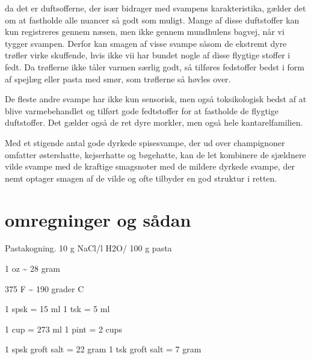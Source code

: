 \documentclass[
]{book}
\begin{document}
da det er duftsofferne, der især bidrager med svampens karakteristika, gælder
det om at fastholde alle nuancer så godt som muligt. Mange af disse duftstoffer
kan kun registreres gennem næsen, men ikke gennem mundhulens bagvej, når vi
tygger svampen. Derfor kan smagen af visse svampe såsom de ekstremt dyre trøfler
virke skuffende, hvis ikke vii har bundet nogle af disse flygtige stoffer i fedt.
Da trøflerne ikke tåler varmen særlig godt, så tilføres fedstoffer bedst i form
af spejlæg eller pasta med smør, som trøflerne så høvles over.

De fleste andre svampe har ikke kun sensorisk, men også toksikologisk bedst af at
blive varmebehandlet og tilført gode fedtstoffer for at fastholde de flygtige
duftstoffer. Det gælder også de ret dyre morkler, men også hele kantarelfamilien.

Med et stigende antal gode dyrkede spisesvampe, der ud over champignoner omfatter
østershatte, kejserhatte og bøgehatte, kan de let kombinere de sjældnere
vilde svampe med de kraftige smagsnoter med de mildere dyrkede svampe, der
nemt optager smagen af de vilde og ofte tilbyder en god struktur i retten.

\chapter{omregninger og sådan}\label{omregninger-og-suxe5dan}

Pastakogning. 10 g NaCl/l H2O/ 100 g pasta

1 oz \textasciitilde{} 28 gram

375 F \textasciitilde{} 190 grader C

1 spsk = 15 ml
1 tsk = 5 ml

1 cup = 273 ml
1 pint = 2 cups

1 spsk groft salt = 22 gram
1 tsk groft salt = 7 gram
\end{document}

